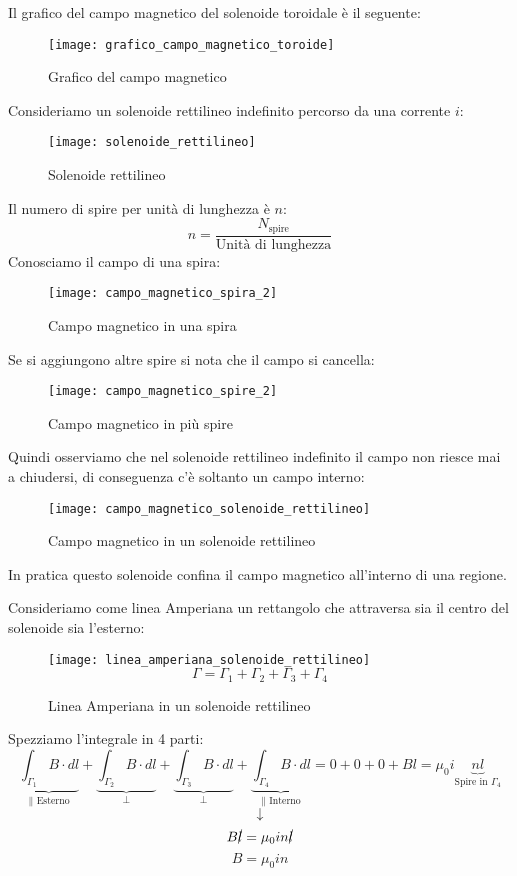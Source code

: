 \documentclass[a4paper]{article}
\begin{document}
\begin{example}
  \vspace{1em}
  \noindent
  Il grafico del campo magnetico del solenoide toroidale è il seguente:
  \begin{figure}[H]
    \centering
    \texttt{[image: grafico\_campo\_magnetico\_toroide]}
    \caption{Grafico del campo magnetico}
  \end{figure}
\end{example}

\begin{example}
  Consideriamo un solenoide rettilineo indefinito percorso da una corrente \( i \):
  \begin{figure}[H]
    \centering
    \texttt{[image: solenoide\_rettilineo]}
    \caption{Solenoide rettilineo}
  \end{figure}
  \noindent
  Il numero di spire per unità di lunghezza è \( n \):
  \[
    n = \frac{N_{\text{spire}}}{\text{Unità di lunghezza}}
  \] 
  Conosciamo il campo di una spira:
  \begin{figure}[H]
    \centering
    \texttt{[image: campo\_magnetico\_spira\_2]}
    \caption{Campo magnetico in una spira}
  \end{figure}
  \noindent
  Se si aggiungono altre spire si nota che il campo si cancella:
  \begin{figure}[H]
    \centering
    \texttt{[image: campo\_magnetico\_spire\_2]}
    \caption{Campo magnetico in più spire}
  \end{figure}
  \noindent
  Quindi osserviamo che nel solenoide rettilineo indefinito il campo non riesce mai a
  chiudersi, di conseguenza c'è soltanto un campo interno:
  \begin{figure}[H]
    \centering
    \texttt{[image: campo\_magnetico\_solenoide\_rettilineo]}
    \caption{Campo magnetico in un solenoide rettilineo}
  \end{figure}
  \noindent
  In pratica questo solenoide confina il campo magnetico all'interno di una regione.

  \vspace{1em}
  \noindent
  Consideriamo come linea Amperiana un rettangolo che attraversa sia il centro del
  solenoide sia l'esterno:
  \begin{figure}[H]
    \centering
    \texttt{[image: linea\_amperiana\_solenoide\_rettilineo]}
    \[
      \Gamma = \Gamma _1 + \Gamma _2 + \Gamma _3 + \Gamma _4
    \] 
    \caption{Linea Amperiana in un solenoide rettilineo}
  \end{figure}
  \noindent
  Spezziamo l'integrale in 4 parti:
  \[
    \underbrace{\int_{\Gamma_1} B \cdot dl}_{\parallel \text{ Esterno}} +
    \underbrace{\int_{\Gamma_2} B \cdot dl}_{\perp} +
    \underbrace{\int_{\Gamma_3} B \cdot dl}_{\perp} +
    \underbrace{\int_{\Gamma_4} B \cdot dl}_{\parallel \text{ Interno}}
    = 0 + 0 + 0 + Bl = \mu_0 i \underbrace{nl}_{\text{Spire in } \Gamma_4}
  \] 
  \[
    \downarrow
  \] 
  \[
    B\cancel{l} = \mu_0 i n \cancel{l}
  \] 
  \[
    B = \mu_0 i n
  \] 
\end{example}
\end{document}

